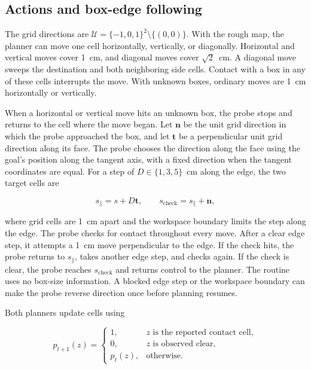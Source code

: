 \documentclass[letterpaper,journal]{IEEEtran}
\begin{document}
\subsection{Actions and box-edge following}

The grid directions are $\mathcal U=\{-1,0,1\}^2\setminus\{(0,0)\}$. With the rough map, the planner can move one cell horizontally, vertically, or diagonally. Horizontal and vertical moves cover 1~cm, and diagonal moves cover $\sqrt2$~cm. A diagonal move sweeps the destination and both neighboring side cells. Contact with a box in any of these cells interrupts the move. With unknown boxes, ordinary moves are 1~cm horizontally or vertically.

When a horizontal or vertical move hits an unknown box, the probe stops and returns to the cell where the move began. Let $\mathbf n$ be the unit grid direction in which the probe approached the box, and let $\mathbf t$ be a perpendicular unit grid direction along its face. The probe chooses the direction along the face using the goal's position along the tangent axis, with a fixed direction when the tangent coordinates are equal. For a step of $D\in\{1,3,5\}$~cm along the edge, the two target cells are

\begin{equation}
 s_{\parallel}=s+D\mathbf t,\qquad
 s_{\mathrm{check}}=s_{\parallel}+\mathbf n ,
 \label{eq:edge_targets}
\end{equation}

where grid cells are 1~cm apart and the workspace boundary limits the step along the edge. The probe checks for contact throughout every move. After a clear edge step, it attempts a 1~cm move perpendicular to the edge. If the check hits, the probe returns to $s_{\parallel}$, takes another edge step, and checks again. If the check is clear, the probe reaches $s_{\mathrm{check}}$ and returns control to the planner. The routine uses no box-size information. A blocked edge step or the workspace boundary can make the probe reverse direction once before planning resumes.

Both planners update cells using

\begin{equation}
 p_{t+1}(z)=
 \begin{cases}
 1,&z\text{ is the reported contact cell},\\
 0,&z\text{ is observed clear},\\
 p_t(z),&\text{otherwise}.
 \end{cases}
\end{equation}
\end{document}
